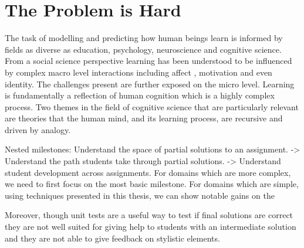 \section{The Problem is Hard}

The task of modelling and predicting how human beings learn is informed by fields as diverse
as education, psychology, neuroscience and cognitive science. From a social science perspective
learning has been understood to be influenced by complex macro level interactions including affect
, motivation and even identity. The challenges present are further exposed on the micro
level. Learning is fundamentally a reflection of human cognition which is a highly complex process.
Two themes in the field of cognitive science that are particularly relevant are theories that the human
mind, and its learning process, are recursive and driven by analogy.

Nested milestones: Understand the space of partial solutions to an assignment.
->
Understand the path students take through partial solutions.
->
Understand student development across assignments. 
For domains which are more complex, we need to first focus on the most basic milestone. For domains which are simple, using techniques presented in this thesis, we can show notable gains on the 

Moreover, though unit tests are a useful way to test if final solutions are correct they are not well suited for giving help to students with an intermediate solution and they are not able to give feedback on stylistic elements.








